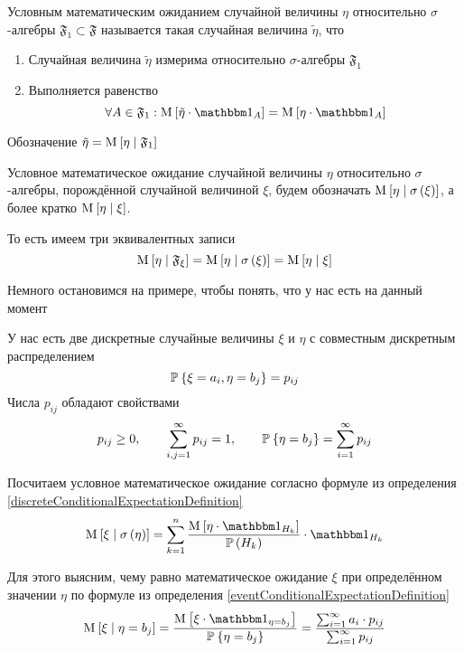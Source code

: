 \begin{definition}
  Условным математическим ожиданием случайной величины $\eta$
  относительно $\sigma$-алгебры $\mathfrak{F}_1 \subset \mathfrak{F}$
  называется такая случайная величина $\tilde{\eta}$, что
  \begin{enumerate}
      \item Случайная величина $\tilde{\eta}$
      измерима относительно $\sigma$-алгебры $\mathfrak{F}_1$
      \item Выполняется равенство
      $$\forall A \in \mathfrak{F}_1:
      \Mean{ \tilde{\eta} \cdot \indicatorof{A} }
    = \Mean{ \eta \cdot \indicatorof{A} }$$
  \end{enumerate}
  Обозначение $\tilde{\eta} = \operatorname{M}_{} \left[  \eta \;\middle|\; \mathfrak{F}_1  \right]$

\end{definition}

\begin{remark}
  Условное математическое ожидание случайной величины $\eta$
  относительно $\sigma$-алгебры, порождённой случайной величиной $\xi$,
  будем обозначать $\operatorname{M}_{} \left[  \eta \;\middle|\; \sigma\left( \xi \right)  \right]$,
  а более кратко $\operatorname{M}_{} \left[  \eta \;\middle|\; \xi  \right]$.

  То есть имеем три эквивалентных записи
  $$\operatorname{M}_{} \left[  \eta \;\middle|\; \mathfrak{F}_{\xi}  \right]
      = \operatorname{M}_{} \left[  \eta \;\middle|\; \sigma\left( \xi \right)  \right]
      = \operatorname{M}_{} \left[  \eta \;\middle|\; \xi  \right]$$
\end{remark}

Немного остановимся на примере, чтобы понять, что у нас есть на данный момент

\begin{example}\label{discreteConditionalExpectationExample}
  У нас есть две дискретные случайные величины $\xi$ и $\eta$
  с совместным дискретным распределением
  $$\mathbb{P}_{{}}\left\{ \xi = a_i, \eta = b_j \right\} = p_{ij}$$
  Числа $p_{ij}$ обладают свойствами
  $$p_{ij} \ge 0, \qquad \sum_{i,j=1}^\infty p_{ij} = 1,
      \qquad \mathbb{P}_{{}}\left\{ \eta = b_j \right\} = \sum_{i=1}^\infty p_{ij}$$

  Посчитаем условное математическое ожидание согласно формуле
  из определения \eqref{discreteConditionalExpectationDefinition}
  $$\Mean{\xi \mcond \sigma\left( \eta \right)} = \sum_{k=1}^n
      \frac{\Mean{\eta \cdot \indicatorof{H_k}}}{\probability{H_k}}
      \cdot \indicatorof{H_k}$$

  Для этого выясним, чему равно математическое ожидание $\xi$
  при определённом значении $\eta$ по формуле из определения
  \eqref{eventConditionalExpectationDefinition}
  $$\Mean{\xi \mcond \eta = b_j}
      = \frac{\Mean{\xi \cdot \indicatorof{\eta = b_j}}}{
      \Probability{\eta = b_j}}
      = \frac{\sum_{i=1}^{\infty} a_i \cdot p_{ij}}{
      \sum_{i=1}^{\infty} p_{ij}}$$
\end{example}

